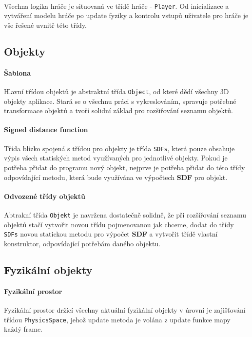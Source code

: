 \documentclass[a4paper, 12pt]{article}
\begin{document}
\paragraph{}
Všechna logika hráče je situovaná ve třídě hráče - \texttt{Player}. Od
inicializace a vytváření modelu hráče po update fyziky a kontrolu vstupů
uživatele pro hráče je vše řešené uvnitř této třídy.

\subsection{Objekty}
\paragraph{Šablona}
Hlavní třídou objektů je abstraktní třída \texttt{Object}, od které dědí
všechny 3D objekty aplikace. Stará se o všechnu práci s vykreslováním, spravuje
potřebné transformace objektů a tvoří solidní základ pro rozšiřování seznamu
objektů. 

\paragraph{Signed distance function}
Třída blízko spojená s třídou pro objekty je třída \texttt{SDFs}, která pouze
obsahuje výpis všech statiských metod využívaných pro jednotlivé objekty. Pokud
je potřeba přidat do programu nový objekt, nejprve je potřeba přidat do této
třídy odpovídající metodu, která bude využívána ve výpočtech \textbf{SDF} pro
objekt.

\paragraph{Odvozené třídy objektů}
Abtrakní třída \texttt{Objekt} je navržena dostatečně solidně, že při
rozšířování seznamu objektů stačí vytvořit novou třídu pojmenovanou jak chceme,
dodat do třídy \texttt{SDFs} novou statickou metodu pro výpočet \textbf{SDF} a
vytvořit třídě vlastní konstruktor, odpovídající potřebám daného objektu.

\subsection{Fyzikální objekty}
\paragraph{Fyzikální prostor} 
Fyzikální prostor držící všechny aktuální fyzikální objekty v úrovni je
zajišťování třídou \texttt{PhysicsSpace}, jehož update metoda je volána z
update funkce mapy každý frame.
\end{document}
